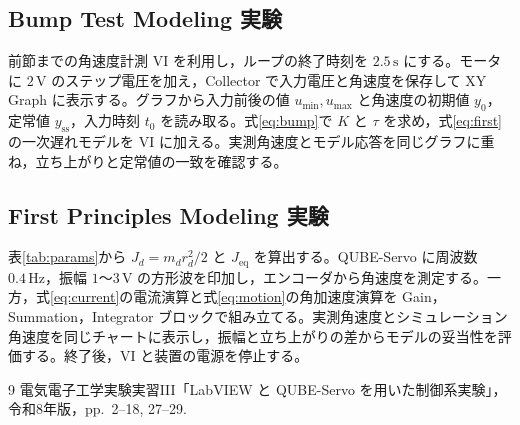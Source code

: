 \documentclass[dvipdfmx,a4paper,11pt]{jsarticle}
\begin{document}
\clearpage
\subsection{Bump Test Modeling 実験}
前節までの角速度計測 VI を利用し，ループの終了時刻を $2.5\,\mathrm{s}$ にする。モータに $2\,\mathrm{V}$ のステップ電圧を加え，Collector で入力電圧と角速度を保存して XY Graph に表示する。グラフから入力前後の値 $u_{\min},u_{\max}$ と角速度の初期値 $y_0$，定常値 $y_{\mathrm{ss}}$，入力時刻 $t_0$ を読み取る。式\eqref{eq:bump}で $K$ と $\tau$ を求め，式\eqref{eq:first}の一次遅れモデルを VI に加える。実測角速度とモデル応答を同じグラフに重ね，立ち上がりと定常値の一致を確認する。

\subsection{First Principles Modeling 実験}
表\ref{tab:params}から $J_d=m_dr_d^2/2$ と $J_{\mathrm{eq}}$ を算出する。QUBE-Servo に周波数 $0.4\,\mathrm{Hz}$，振幅 $1$～$3\,\mathrm{V}$ の方形波を印加し，エンコーダから角速度を測定する。一方，式\eqref{eq:current}の電流演算と式\eqref{eq:motion}の角加速度演算を Gain，Summation，Integrator ブロックで組み立てる。実測角速度とシミュレーション角速度を同じチャートに表示し，振幅と立ち上がりの差からモデルの妥当性を評価する。終了後，VI と装置の電源を停止する。



\begin{thebibliography}{9}
 電気電子工学実験実習III「LabVIEW と QUBE-Servo を用いた制御系実験」，令和8年版，pp.~2--18, 27--29.
\end{thebibliography}
\end{document}

